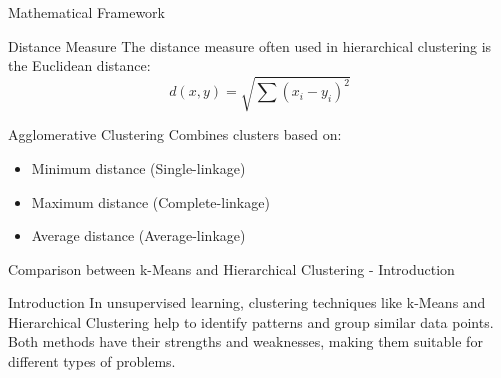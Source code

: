 \documentclass[aspectratio=169]{beamer}
\begin{document}
\begin{frame}[fragile]{Mathematical Framework}
    \begin{block}{Distance Measure}
        The distance measure often used in hierarchical clustering is the Euclidean distance:
        \[
        d(x, y) = \sqrt{\sum (x_i - y_i)^2}
        \]
    \end{block}
    \begin{block}{Agglomerative Clustering}
        Combines clusters based on:
        \begin{itemize}
            \item Minimum distance (Single-linkage)
            \item Maximum distance (Complete-linkage)
            \item Average distance (Average-linkage)
        \end{itemize}
    \end{block}
\end{frame}

\begin{frame}[fragile]{Comparison between k-Means and Hierarchical Clustering - Introduction}
    \begin{block}{Introduction}
        In unsupervised learning, clustering techniques like k-Means and Hierarchical Clustering help to identify patterns and group similar data points. 
        Both methods have their strengths and weaknesses, making them suitable for different types of problems.
    \end{block}
\end{frame}
\end{document}
